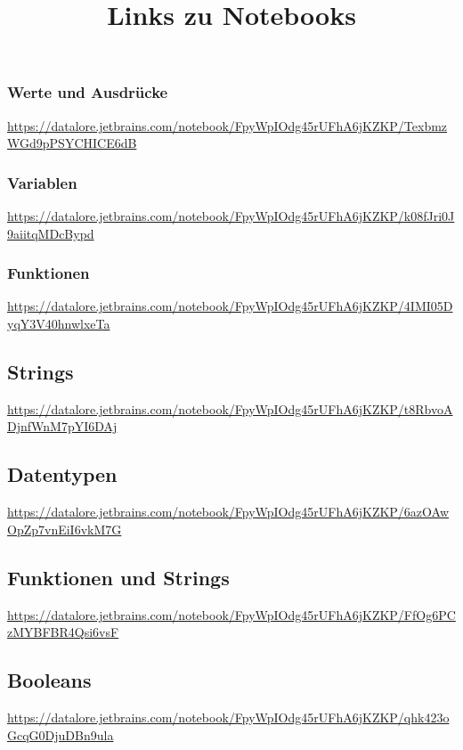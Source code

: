 \documentclass[]{scrartcl}
\title{Links zu Notebooks}
\begin{document}
	
\subsubsection*{Werte und Ausdrücke}

\url{https://datalore.jetbrains.com/notebook/FpyWpIOdg45rUFhA6jKZKP/TexbmzWGd9pPSYCHICE6dB}
	
\subsubsection*{Variablen}

\url{https://datalore.jetbrains.com/notebook/FpyWpIOdg45rUFhA6jKZKP/k08fJri0J9aiitqMDcBypd}
\subsubsection*{Funktionen}

\url{https://datalore.jetbrains.com/notebook/FpyWpIOdg45rUFhA6jKZKP/4IMI05DyqY3V40hnwlxeTa}
\subsection*{Strings}
\url{https://datalore.jetbrains.com/notebook/FpyWpIOdg45rUFhA6jKZKP/t8RbvoADjnfWnM7pYI6DAj}
%
\subsection*{Datentypen}
\url{https://datalore.jetbrains.com/notebook/FpyWpIOdg45rUFhA6jKZKP/6azOAwOpZp7vnEiI6vkM7G}
%
\subsection*{Funktionen und Strings}
\url{https://datalore.jetbrains.com/notebook/FpyWpIOdg45rUFhA6jKZKP/FfOg6PCzMYBFBR4Qsi6vsF}
%
%
%
%
\subsection*{Booleans}
\url{https://datalore.jetbrains.com/notebook/FpyWpIOdg45rUFhA6jKZKP/qhk423oGcqG0DjuDBn9ula}
\end{document}
